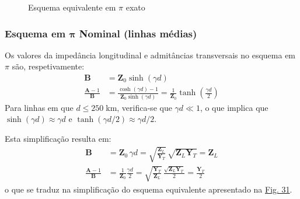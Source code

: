 \vspace{-1.25em}
\begin{figure}[H]
    \centering
    \caption{Esquema equivalente em $\pi$ exato}
    \label{fig:linha-transmissao-esq-exato}
\end{figure}

\subsubsection[Esquema em $\pi$ Nominal (linhas médias)]{Esquema em $\pmb{\pi}$ Nominal (linhas médias)}

Os valores da impedância longitudinal e admitâncias transversais no esquema em $\pi$ são, respetivamente:
$$
    \begin{aligned}
        \mathbf{B} &= \mathbf{Z}_0 \sinh(\gamma d) \\[1pt]
        \frac{\mathbf{A}-1}{\mathbf{B}} &= \frac{\cosh(\gamma d)-1}{\mathbf{Z}_0 \sinh(\gamma d)} = \frac{1}{\mathbf{Z}_0} \tanh\left(\frac{\gamma d}{2}\right)
    \end{aligned}
$$
Para linhas em que $d \le 250\;$km, verifica-se que $\gamma d \ll 1$, o que implica que $\sinh(\gamma d) \approx \gamma d$ e $\tanh(\gamma d/2) \approx \gamma d/2$.

Esta simplificação resulta em:
$$
    \begin{aligned}
        \mathbf{B} &= \mathbf{Z}_0\, \gamma d = \sqrt{\frac{\mathbf{Z}_L}{\mathbf{Y}_T}}\, \sqrt{\mathbf{Z}_L \mathbf{Y}_T} = \mathbf{Z}_L \\[1pt]
        \frac{\mathbf{A}-1}{\mathbf{B}} &= \frac{1}{\mathbf{Z}_0} \frac{\gamma d}{2} = \sqrt{\frac{\mathbf{Y}_T}{\mathbf{Z}_L}}\, \frac{\sqrt{\mathbf{Z}_L \mathbf{Y}_T}}{2} = \frac{\mathbf{Y}_T}{2}
    \end{aligned}%
$$
o que se traduz na simplificação do esquema equivalente apresentado na \hyperref[fig:linha-transmissao-esq-nominal]{Fig. 31}.

